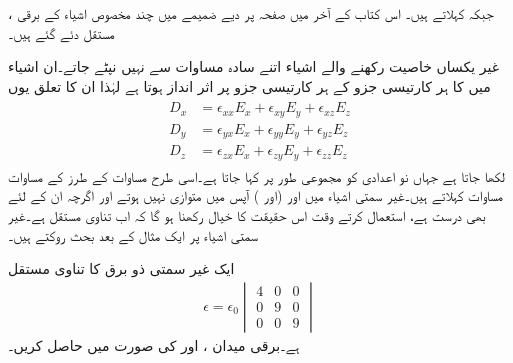  ،   جبکہ     کہلاتے ہیں۔ اس کتاب کے آخر میں صفحہ  پر دیے ضمیمے میں چند مخصوص اشیاء کے برقی مستقل دئے گئے ہیں۔

غیر یکساں خاصیت رکھنے والے اشیاء اتنے سادہ مساوات سے نہیں نپٹے جاتے۔ان اشیاء میں  کا ہر کارتیسی جزو    کے ہر کارتیسی جزو پر اثر انداز ہوتا ہے لہٰذا ان کا تعلق یوں
\begin{gather}
\begin{aligned}\label{مساوت_کپیسٹر_تناوی-مساوات}
D_x&=\epsilon_{xx} E_x +\epsilon_{xy} E_y+\epsilon_{xz} E_z\\
D_y&=\epsilon_{yx} E_x +\epsilon_{yy} E_y+\epsilon_{yz} E_z\\
D_z&=\epsilon_{zx} E_x +\epsilon_{zy} E_y+\epsilon_{zz} E_z
\end{aligned}
\end{gather}
لکھا جاتا ہے جہاں نو اعدادی  کو مجموعی طور پر  کہا جاتا ہے۔اسی طرح مساوات  کے طرز کے مساوات  مساوات کہلاتے ہیں۔غیر سمتی اشیاء میں  اور   (اور ) آپس میں متوازی نہیں  ہوتے اور اگرچہ  ان کے لئے بھی درست ہے،  استعمال کرتے وقت  اس حقیقت کا خیال رکھنا ہو گا کہ  اب تناوی مستقل ہے۔غیر سمتی اشیاء پر ایک مثال کے بعد بحث روکتے ہیں۔

ایک غیر سمتی ذو برق کا تناوی مستقل
\begin{align*}
\epsilon=\epsilon_0 
\begin{vmatrix}
4 & 0 & 0 \\
0 & 9 & 0\\
0 & 0 &9
\end{vmatrix}
\end{align*}
ہے۔برقی میدان ،  اور  کی صورت میں  حاصل کریں۔

